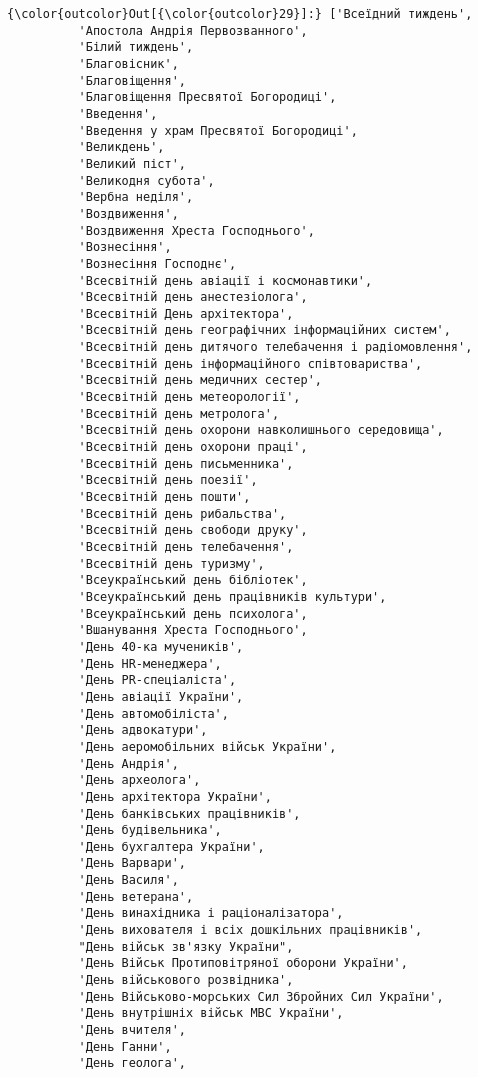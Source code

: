 \documentclass[11pt]{article}
\begin{document}
\begin{Verbatim}[commandchars=\\\{\}]
{\color{outcolor}Out[{\color{outcolor}29}]:} ['Всеїдний тиждень',
          'Апостола Андрія Первозванного',
          'Білий тиждень',
          'Благовісник',
          'Благовіщення',
          'Благовіщення Пресвятої Богородиці',
          'Введення',
          'Введення у храм Пресвятої Богородиці',
          'Великдень',
          'Великий піст',
          'Великодня субота',
          'Вербна неділя',
          'Воздвиження',
          'Воздвиження Хреста Господнього',
          'Вознесіння',
          'Вознесіння Господнє',
          'Всесвітній день авіації і космонавтики',
          'Всесвітній день анестезіолога',
          'Всесвітній День архітектора',
          'Всесвітній день географічних інформаційних систем',
          'Всесвітній день дитячого телебачення і радіомовлення',
          'Всесвітній день інформаційного співтовариства',
          'Всесвітній день медичних сестер',
          'Всесвітній день метеорології',
          'Всесвітній день метролога',
          'Всесвітній день охорони навколишнього середовища',
          'Всесвітній день охорони праці',
          'Всесвітній день письменника',
          'Всесвітній день поезії',
          'Всесвітній день пошти',
          'Всесвітній день рибальства',
          'Всесвітній день свободи друку',
          'Всесвітній день телебачення',
          'Всесвітній день туризму',
          'Всеукраїнський день бібліотек',
          'Всеукраїнський день працівників культури',
          'Всеукраїнський день психолога',
          'Вшанування Хреста Господнього',
          'День 40-ка мучеників',
          'День HR-менеджера',
          'День PR-спеціаліста',
          'День авіації України',
          'День автомобіліста',
          'День адвокатури',
          'День аеромобільних військ України',
          'День Андрія',
          'День археолога',
          'День архітектора України',
          'День банківських працівників',
          'День будівельника',
          'День бухгалтера України',
          'День Варвари',
          'День Василя',
          'День ветерана',
          'День винахідника і раціоналізатора',
          'День вихователя і всіх дошкільних працівників',
          "День військ зв'язку України",
          'День Військ Протиповітряної оборони України',
          'День військового розвідника',
          'День Військово-морських Сил Збройних Сил України',
          'День внутрішніх військ МВС України',
          'День вчителя',
          'День Ганни',
          'День геолога',

\end{Verbatim}
\end{document}
